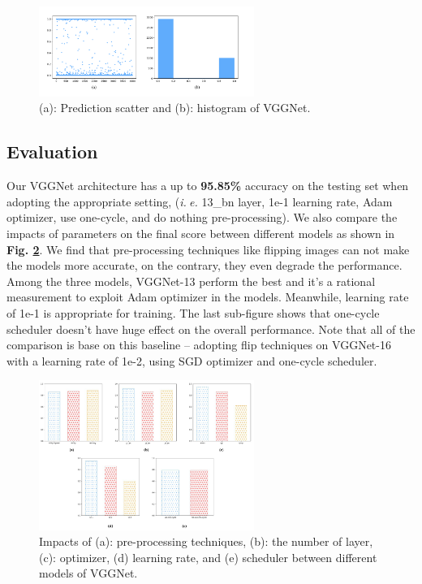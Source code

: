 \documentclass[10pt,twocolumn,letterpaper]{article}
\begin{document}
\begin{figure}[h]
\centering
\includegraphics[width=7cm]{vgg_best.pdf}
\caption{(a): Prediction scatter and (b): histogram of \textsf{VGGNet}.}
\label{vggresults}
\end{figure}

\subsection{Evaluation}

Our \textsf{VGGNet} architecture has a up to \textbf{95.85\%} accuracy on the testing set when adopting the appropriate setting, (\textit{i.$\ $e.} 13\_bn layer, 1e-1 learning rate, Adam optimizer, use one-cycle, and do nothing pre-processing). We also compare the impacts of parameters on the final score between different models as shown in \textbf{Fig. \ref{vggcompare}}. We find that pre-processing techniques like flipping images can not make the models more accurate, on the contrary, they even degrade the performance. Among the three models, \textsf{VGGNet-13} perform the best and it's a rational measurement to exploit Adam optimizer in the models. Meanwhile, learning rate of 1e-1 is appropriate for training. The last sub-figure shows that one-cycle scheduler doesn't have huge effect on the overall performance. Note that all of the comparison is base on this baseline -- adopting flip techniques on \textsf{VGGNet-16} with a learning rate of 1e-2, using SGD optimizer and one-cycle scheduler.

\begin{figure}[h]
\centering
\includegraphics[width=7cm]{vgg.pdf}
\caption{Impacts of (a): pre-processing techniques, (b): the number of layer, (c): optimizer, (d) learning rate, and (e) scheduler between different models of \textsf{VGGNet}.}
\label{vggcompare}
\end{figure}
\end{document}
